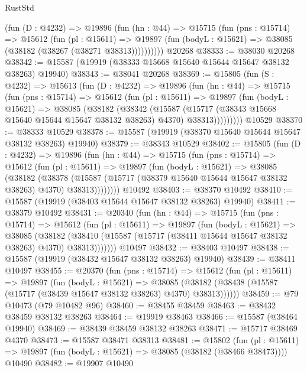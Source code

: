 \begin{lexlean}{RustStd}
\begin{coremodule}
        (fun (D : @4232) =>
        @19896
          (fun (hn : @44) =>
          @15715
            (fun (pns : @15714) =>
            @15612
              (fun (pl : @15611) =>
              @19897 (fun (bodyL : @15621) => @38085 (@38182 (@38267 (@38271 @38313))))))))))
    @20268
@38333 := @38030 @20268
@38342 := @15587 (@19919 (@38333 @15668 @15640 @15644 @15647 @38132 @38263) @19940)
@38343 := @38041 @20268
@38369 := @15805
    (fun (S : @4232) =>
    @15613
      (fun (D : @4232) =>
      @19896
        (fun (hn : @44) =>
        @15715
          (fun (pns : @15714) =>
          @15612
            (fun (pl : @15611) =>
            @19897
              (fun (bodyL : @15621) =>
              @38085
                (@38182
                  (@38342
                    (@15587
                      (@15717 (@38343 @15668 @15640 @15644 @15647 @38132 @38263) @4370)
                      @38313)))))))))
    @10529
@38370 := @38333 @10529
@38378 := @15587 (@19919 (@38370 @15640 @15644 @15647 @38132 @38263) @19940)
@38379 := @38343 @10529
@38402 := @15805
    (fun (D : @4232) =>
    @19896
      (fun (hn : @44) =>
      @15715
        (fun (pns : @15714) =>
        @15612
          (fun (pl : @15611) =>
          @19897
            (fun (bodyL : @15621) =>
            @38085
              (@38182
                (@38378
                  (@15587 (@15717 (@38379 @15640 @15644 @15647 @38132 @38263) @4370) @38313))))))))
    @10492
@38403 := @38370 @10492
@38410 := @15587 (@19919 (@38403 @15644 @15647 @38132 @38263) @19940)
@38411 := @38379 @10492
@38431 := @20340
    (fun (hn : @44) =>
    @15715
      (fun (pns : @15714) =>
      @15612
        (fun (pl : @15611) =>
        @19897
          (fun (bodyL : @15621) =>
          @38085
            (@38182
              (@38410 (@15587 (@15717 (@38411 @15644 @15647 @38132 @38263) @4370) @38313)))))))
    @10497
@38432 := @38403 @10497
@38438 := @15587 (@19919 (@38432 @15647 @38132 @38263) @19940)
@38439 := @38411 @10497
@38455 := @20370
    (fun (pns : @15714) =>
    @15612
      (fun (pl : @15611) =>
      @19897
        (fun (bodyL : @15621) =>
        @38085 (@38182 (@38438 (@15587 (@15717 (@38439 @15647 @38132 @38263) @4370) @38313))))))
@38459 := @79 @10473 (@79 @10482 @96)
@38460 := @38455 @38459
@38463 := @38432 @38459 @38132 @38263
@38464 := @19919 @38463
@38466 := @15587 (@38464 @19940)
@38469 := @38439 @38459 @38132 @38263
@38471 := @15717 @38469 @4370
@38473 := @15587 @38471 @38313
@38481 := @15802
    (fun (pl : @15611) => @19897 (fun (bodyL : @15621) => @38085 (@38182 (@38466 @38473))))
    @10490
@38482 := @19907 @10490

\end{coremodule}
\end{lexlean}
